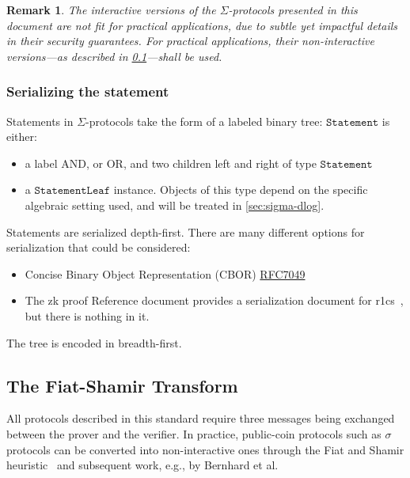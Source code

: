 \documentclass[runningheads,11pt]{article}
\newtheorem{remark}{Remark}
\newcommand{\statementnode}{\texttt{Statement}}
\newcommand{\statementleaf}{\texttt{StatementLeaf}}
\begin{document}
\begin{remark}
  The interactive versions of the $\Sigma$-protocols presented in this document are not fit for practical applications, due to subtle yet impactful details in their security guarantees.
 For practical applications, their non-interactive versions---as described in \cref{sec:fs}---shall be used.
\end{remark}


\subsubsection{Serializing the statement}

Statements in $\Sigma$-protocols take the form of a labeled binary tree:
$\statementnode$ is either:
\begin{itemize}
  \item a label \textsf{AND}, or \textsf{OR}, and two children \textsf{left} and \textsf{right} of type $\statementnode$
  \item a $\statementleaf$ instance. Objects of this type depend on the specific algebraic setting used, and will be treated in \cref{sec:sigma-dlog}.
\end{itemize}
Statements are serialized depth-first.
  There are many different options for serialization that could be considered:
  \begin{itemize}
  \item Concise Binary Object Representation (CBOR) \href{https://datatracker.ietf.org/doc/html/rfc7049}{RFC7049}
    \item The zk proof Reference document provides a serialization document for r1cs~\cite[3.4.2]{zkproof-reference}, but there is nothing in it.
\end{itemize}
The tree is encoded in breadth-first.



\subsection{The Fiat-Shamir Transform}\label{sec:fs}
All protocols described in this standard require three messages being exchanged between the prover and the verifier.
In practice, public-coin protocols such as $\sigma$ protocols can be converted into non-interactive ones through the
Fiat and Shamir heuristic~\cite{C:FiaSha86} and subsequent work, e.g., by Bernhard et al.~\cite{AC:BerPerWar12}
\end{document}
